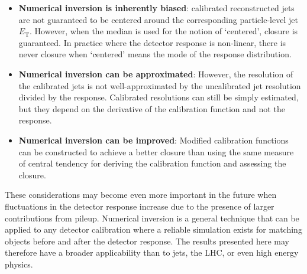 \begin{itemize}
\item {\bf Numerical inversion is inherently biased}: calibrated reconstructed jets are not guaranteed to be centered around the corresponding particle-level jet $E_\text{T}$.  However, when the median is used for the notion of `centered', closure is guaranteed.  In practice where the detector response is non-linear, there is never closure when `centered' means the mode of the response distribution.
\item {\bf Numerical inversion can be approximated}: However, the resolution of the calibrated jets is not well-approximated by the uncalibrated jet resolution divided by the response.  Calibrated resolutions can still be simply estimated, but they depend on the derivative of the calibration function and not the response.
\item {\bf Numerical inversion can be improved}: Modified calibration functions can be constructed to achieve a better closure than using the same measure of central tendency for deriving the calibration function and assessing the closure.
\end{itemize}

These considerations may become even more important in the future when fluctuations in the detector response increase due to the presence of larger contributions from pileup.  Numerical inversion is a general technique that can be applied to any detector calibration where a reliable simulation exists for matching objects before and after the detector response.  The results presented here may therefore have a broader applicability than to jets, the LHC, or even high energy physics.

%

\clearpage
\newpage


